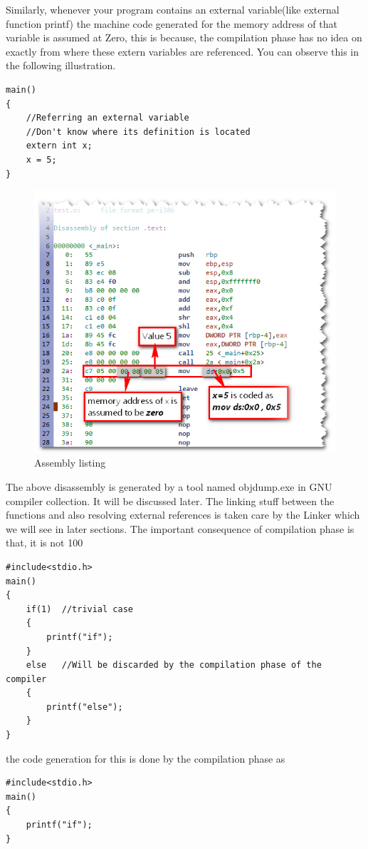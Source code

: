 \documentclass{article}
\begin{document}
Similarly, whenever your program contains an external variable(like external function printf) the machine code generated for the memory address of that variable is assumed at Zero, this is because, the compilation phase has no idea on exactly from where these extern variables are referenced. You can observe this in the following illustration.

\begin{verbatim}
main()
{
    //Referring an external variable
    //Don't know where its definition is located
    extern int x;
    x = 5;
}
\end{verbatim}

\begin{figure}[H]
\centering
\includegraphics[width=\textwidth]{Compilation2.png}
\caption{Assembly listing}
\end{figure}
The above disassembly is generated by a tool named objdump.exe in GNU compiler collection. It will be discussed later. The linking stuff between the functions and also resolving external references is taken care by the Linker which we will see in later sections. The important consequence of compilation phase is that, it is not 100%
\begin{verbatim}
#include<stdio.h>
main()
{
    if(1)  //trivial case
    {
        printf("if");
    }
    else   //Will be discarded by the compilation phase of the compiler
    {
        printf("else");
    }
}
\end{verbatim}
the code generation for this is done by the compilation phase as
\begin{verbatim}
#include<stdio.h>
main()
{
    printf("if");
}
\end{verbatim}
\end{document}
